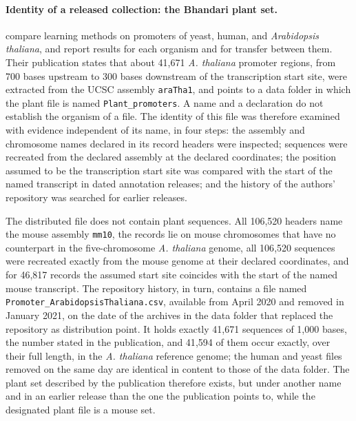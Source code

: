 \paragraph{Identity of a released collection: the Bhandari plant set.}
\citet{bhandari2021comparison} compare learning methods on promoters of yeast,
human, and \textit{Arabidopsis thaliana}, and report results for each organism
and for transfer between them. Their publication states that about 41{,}671
\textit{A. thaliana} promoter regions, from 700 bases upstream to 300 bases
downstream of the transcription start site, were extracted from the UCSC
assembly \texttt{araTha1}, and points to a data folder in which the plant file
is named \texttt{Plant\_promoters}. A name and a declaration do not establish
the organism of a file. The identity of this file was therefore examined with
evidence independent of its name, in four steps: the assembly and chromosome
names declared in its record headers were inspected; sequences were recreated
from the declared assembly at the declared coordinates; the position assumed
to be the transcription start site was compared with the start of the named
transcript in dated annotation releases; and the history of the authors'
repository was searched for earlier releases.

The distributed file does not contain plant sequences. All 106{,}520 headers
name the mouse assembly \texttt{mm10}, the records lie on mouse chromosomes
that have no counterpart in the five-chromosome \textit{A. thaliana} genome,
all 106{,}520 sequences were recreated exactly from the mouse genome at their
declared coordinates, and for
46{,}817 records the assumed start site coincides with the start of the named
mouse transcript. The repository history, in turn, contains a file named
\texttt{Promoter\_ArabidopsisThaliana.csv}, available from April 2020 and
removed in January 2021, on the date of the archives in the data folder that
replaced the repository as distribution point. It holds
exactly 41{,}671 sequences of 1{,}000 bases, the number stated in the
publication, and 41{,}594 of them occur exactly, over their full length, in the
\textit{A. thaliana} reference genome; the human and yeast files removed on the
same day are identical in content to those of the data folder. The plant set
described by the publication therefore exists, but under another name and in
an earlier release than the one the publication points to, while the
designated plant file is a mouse set.


